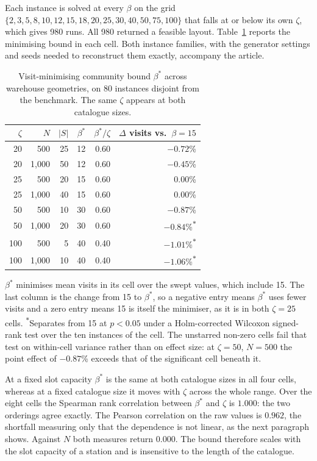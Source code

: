 \documentclass[11pt]{article}
\newcommand{\tbl}[1]{\caption{#1}}
\newcommand{\tabnote}[1]{\vspace{2pt}\footnotesize\raggedright #1\par}
\begin{document}
Each instance is solved at every $\beta$ on the grid
$\{2,3,5,8,10,12,15,18,20,25,30,40,50,75,100\}$ that falls at or below its own $\zeta$, which
gives 980 runs. All 980 returned a feasible layout. Table~\ref{tab:capsweep} reports the
minimising bound in each cell. Both instance families, with the generator settings and seeds
needed to reconstruct them exactly, accompany the article.

\begin{table}[H]
\centering
\tbl{Visit-minimising community bound $\beta^\ast$ across warehouse geometries, on 80 instances disjoint from the benchmark. The same $\zeta$ appears at both catalogue sizes.}
{\small\begin{tabular*}{\textwidth}{@{\extracolsep{\fill}}rrrrrr@{}}
\toprule
$\zeta$ & $N$ & $|S|$ & $\beta^\ast$ & $\beta^\ast/\zeta$ & $\Delta$ visits vs.\ $\beta=15$ \\
\midrule
20  & 500   & 25 & 12 & 0.60 & $-0.72$\% \\
20  & 1{,}000 & 50 & 12 & 0.60 & $-0.45$\% \\
25  & 500   & 20 & 15 & 0.60 & $0.00$\% \\
25  & 1{,}000 & 40 & 15 & 0.60 & $0.00$\% \\
50  & 500   & 10 & 30 & 0.60 & $-0.87$\% \\
50  & 1{,}000 & 20 & 30 & 0.60 & $-0.84$\%\textsuperscript{$\ast$} \\
100 & 500   & 5  & 40 & 0.40 & $-1.01$\%\textsuperscript{$\ast$} \\
100 & 1{,}000 & 10 & 40 & 0.40 & $-1.06$\%\textsuperscript{$\ast$} \\
\bottomrule
\end{tabular*}}
\tabnote{$\beta^\ast$ minimises mean visits in its cell over the swept values, which include 15. The last column is the change from 15 to $\beta^\ast$, so a negative entry means $\beta^\ast$ uses fewer visits and a zero entry means 15 is itself the minimiser, as it is in both $\zeta=25$ cells. \textsuperscript{$\ast$}Separates from 15 at $p<0.05$ under a Holm-corrected Wilcoxon signed-rank test over the ten instances of the cell. The unstarred non-zero cells fail that test on within-cell variance rather than on effect size: at $\zeta=50$, $N=500$ the point effect of $-0.87$\% exceeds that of the significant cell beneath it.}
\label{tab:capsweep}
\end{table}

At a fixed slot capacity $\beta^\ast$ is the same at both catalogue sizes in all four cells,
whereas at a fixed catalogue size it moves with $\zeta$ across the whole range. Over the eight
cells the Spearman rank correlation between $\beta^\ast$ and $\zeta$ is $1.000$: the two
orderings agree exactly. The Pearson correlation on the raw values is $0.962$, the shortfall
measuring only that the dependence is not linear, as the next paragraph shows. Against $N$
both measures return $0.000$. The bound therefore scales with the slot capacity of a station
and is insensitive to the length of the catalogue.
\end{document}
